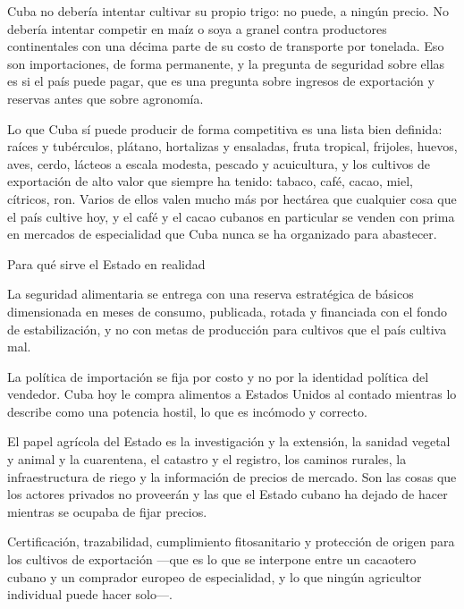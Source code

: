 Cuba no debería intentar cultivar su propio trigo: no puede, a ningún precio. No debería
intentar competir en maíz o soya a granel contra productores continentales con una décima parte
de su costo de transporte por tonelada. Eso son importaciones, de forma permanente, y la
pregunta de seguridad sobre ellas es si el país puede pagar, que es una pregunta sobre ingresos
de exportación y reservas antes que sobre agronomía.

Lo que Cuba sí puede producir de forma competitiva es una lista bien definida: raíces y
tubérculos, plátano, hortalizas y ensaladas, fruta tropical, frijoles, huevos, aves, cerdo,
lácteos a escala modesta, pescado y acuicultura, y los cultivos de exportación de alto valor
que siempre ha tenido: tabaco, café, cacao, miel, cítricos, ron. Varios de ellos valen mucho
más por hectárea que cualquier cosa que el país cultive hoy, y el café y el cacao cubanos en
particular se venden con prima en mercados de especialidad que Cuba nunca se ha organizado para
abastecer.

\begin{design}{Para qué sirve el Estado en realidad}
\label{d:foodsec}
\begin{rules}
 La seguridad alimentaria se entrega con una reserva estratégica de
básicos dimensionada en meses de consumo, publicada, rotada y financiada con el fondo de
estabilización, y no con metas de producción para cultivos que el país cultiva mal.

 La política de importación se fija por costo y no por la
identidad política del vendedor. Cuba hoy le compra alimentos a Estados Unidos al contado
mientras lo describe como una potencia hostil, lo que es incómodo y correcto.

 El papel agrícola del Estado es la investigación y la extensión, la
sanidad vegetal y animal y la cuarentena, el catastro y el registro, los caminos rurales, la
infraestructura de riego y la información de precios de mercado. Son las cosas que los actores
privados no proveerán y las que el Estado cubano ha dejado de hacer mientras se ocupaba de
fijar precios.

 Certificación, trazabilidad, cumplimiento fitosanitario y
protección de origen para los cultivos de exportación ---que es lo que se interpone entre un
cacaotero cubano y un comprador europeo de especialidad, y lo que ningún agricultor individual
puede hacer solo---.
\end{rules}
\end{design}

